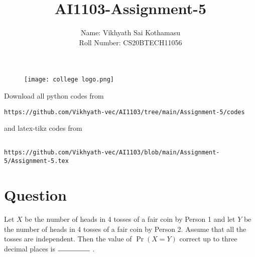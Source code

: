 \documentclass[journal,12pt,twocolumn]{IEEEtran}
\begin{document}
\title{AI1103-Assignment-5}
\author{Name: Vikhyath Sai Kothamasu\\Roll Number: CS20BTECH11056}
\maketitle
\newpage
\bigskip
\renewcommand{\thefigure}{\theenumi}
\renewcommand{\thetable}{\theenumi}

\begin{figure} [h]
    \texttt{[image: college logo.png]}
\end{figure}

Download all python codes from 
\begin{lstlisting}
https://github.com/Vikhyath-vec/AI1103/tree/main/Assignment-5/codes
\end{lstlisting}
%
and latex-tikz codes from 
%
\begin{lstlisting}

https://github.com/Vikhyath-vec/AI1103/blob/main/Assignment-5/Assignment-5.tex
\end{lstlisting}
\section*{Question}

Let $X$ be the number of heads in 4 tosses of a fair coin by Person 1 and let $Y$ be the number of heads in 4 tosses of a fair coin by Person 2. Assume that all the tosses are independent. Then the value of $\Pr{(X=Y)}$ correct up to three decimal places is $\rule{1.6cm}{0.15mm}$ .
\end{document}
